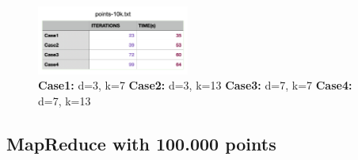 \documentclass{book}
\begin{document}
    \begin{figure}[H]
        \hfill
        \hfill
        \hfill
        \includegraphics[width=5cm]{spark/tabella_point10k}
        \centering
        \caption{\footnotesize{\textbf{Case1:} d=3, k=7 \textbf{Case2:} d=3, k=13 \textbf{Case3:} d=7, k=7 \textbf{Case4:} d=7, k=13}}
    \end{figure}

    \subsection{MapReduce with 100.000 points}
    \paragraph{}
     
\end{document}
